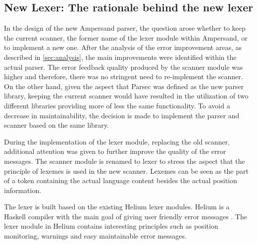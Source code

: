 
\subsection{New Lexer: The rationale behind the new lexer}
\label{subsec:newlexer}

In the design of the new Ampersand parser, the question arose whether to keep the current scanner, the former name of the lexer module within Ampersand, or to implement a new one.
After the analysis of the error improvement areas, as described in \autoref{sec:analysis}, the main improvements were identified within the actual parser.
The error feedback quality produced by the scanner module was higher and therefore, there was no stringent need to re-implement the scanner.
On the other hand, given the aspect that Parsec was defined as the new parser library, keeping the current scanner would have resulted in the utilization of two different libraries providing more of less the same functionality.
To avoid a decrease in maintainability, the decision is made to implement the parser and scanner based on the same library.

During the implementation of the lexer module, replacing the old scanner, additional attention was given to further improve the quality of the error messages.
The scanner module is renamed to lexer to stress the aspect that the principle of lexemes is used in the new scanner.
Lexemes can be seen as the part of a token containing the actual language content besides the actual position information.

The lexer is built based on the existing Helium lexer modules. 
Helium is a Haskell compiler with the main goal of giving user friendly error messages .
The lexer module in Helium contains interesting principles such as position monitoring, warnings and easy maintainable error messages.